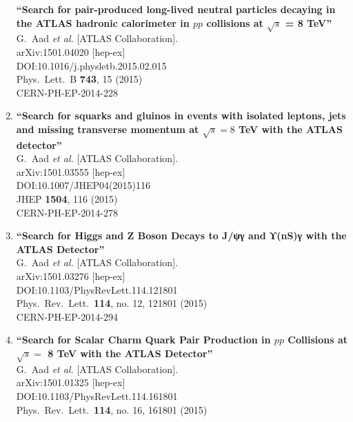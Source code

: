 \documentclass{article}
\begin{document}
\begin{enumerate}
{\bf ``Search for pair-produced long-lived neutral particles decaying in the ATLAS hadronic calorimeter in $pp$ collisions at $\sqrt{s}$ = 8 TeV''}
  \\{}G.~Aad {\it et al.} [ATLAS Collaboration].
  \\{}arXiv:1501.04020 [hep-ex]
  \\{}DOI:10.1016/j.physletb.2015.02.015
  \\{}Phys.\ Lett.\ B {\bf 743}, 15 (2015)
  \\{}CERN-PH-EP-2014-228
\item%
{\bf ``Search for squarks and gluinos in events with isolated leptons, jets and missing transverse momentum at $\sqrt{s}=8$ TeV with the ATLAS detector''}
  \\{}G.~Aad {\it et al.} [ATLAS Collaboration].
  \\{}arXiv:1501.03555 [hep-ex]
  \\{}DOI:10.1007/JHEP04(2015)116
  \\{}JHEP {\bf 1504}, 116 (2015)
  \\{}CERN-PH-EP-2014-278
\item%
{\bf ``Search for Higgs and Z Boson Decays to J/ψγ and ϒ(nS)γ with the ATLAS Detector''}
  \\{}G.~Aad {\it et al.} [ATLAS Collaboration].
  \\{}arXiv:1501.03276 [hep-ex]
  \\{}DOI:10.1103/PhysRevLett.114.121801
  \\{}Phys.\ Rev.\ Lett.\  {\bf 114}, no. 12, 121801 (2015)
  \\{}CERN-PH-EP-2014-294
\item%
{\bf ``Search for Scalar Charm Quark Pair Production in $pp$ Collisions at $\sqrt{s}=$ 8  TeV with the ATLAS Detector''}
  \\{}G.~Aad {\it et al.} [ATLAS Collaboration].
  \\{}arXiv:1501.01325 [hep-ex]
  \\{}DOI:10.1103/PhysRevLett.114.161801
  \\{}Phys.\ Rev.\ Lett.\  {\bf 114}, no. 16, 161801 (2015)

\end{enumerate}
\end{document}
